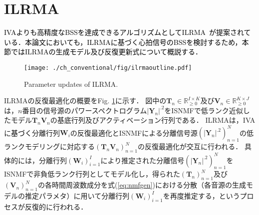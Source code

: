 \section{ILRMA}
\label{sec:conv:ilrma}

\textcolor{black}{IVAよりも高精度なBSSを達成できるアルゴリズムとしてILRMA~\cite{ILRMA, Kitamura2018_ilrma}が提案されている．本論文においても，ILRMAに基づく心拍信号のBSSを検討するため，本節ではILRMAの生成モデル及び反復更新式について概説する．}

\begin{figure}[!t]
\centering
\texttt{[image: ./ch\_conventional/fig/ilrmaoutline.pdf]}
\caption{Parameter updates of ILRMA.}
\label{fig:ilrma_outline}
\end{figure}

ILRMAの反復最適化の概要をFig. \ref{fig:ilrma_outline}に示す．
{図中の}$\bm{T}_n\in\mathbb{R}_{\geq 0}^{I\times K}$及び$\bm{V}_n\in\mathbb{R}_{\geq 0}^{K\times J}$は，$n$番目の信号源のパワースペクトログラム$|\bm{Y}_n|^{.2}$をISNMFで低ランク近似したモデル$\bm{T}_n\bm{V}_n$の基底行列及びアクティベーション行列である．
ILRMAは，IVAに\textcolor{black}{基づく}分離行列$\bm{W}_i$の反復最適化とISNMFによる分離信号源$( |\bm{Y}_n|^{.2} )_{n=1}^N$の低ランクモデリングに対応する$( \bm{T}_n\bm{V}_n )_{n=1}^N$の反復最適化が交互に行われる．
具体的には，分離行列$( \bm{W}_i )_{i=1}^I$により推定された分離信号$( |\bm{Y}_n|^{.2} )_{n=1}^N$をISNMFで非負低ランク行列としてモデル化し，得られた$( \bm{T}_n )_{n=1}^N$及び$( \bm{V}_n )_{n=1}^N$の各時間周波数成分を式(\ref{eq:nmfgen})における分散（各音源の生成モデルの推定パラメタ）に用いて分離行列$( \bm{W}_i )_{i=1}^I$を再度推定する，というプロセスが反復的に行われる．

